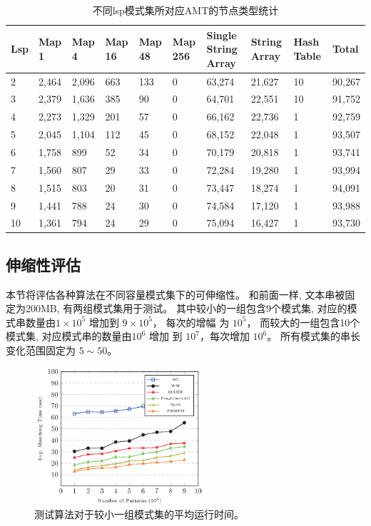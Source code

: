 \begin{table}[!h]
  \centering
  \caption{不同lsp模式集所对应AMT的节点类型统计}
  \scriptsize
  \label{tab:node types}
  \begin{tabular}{p{10pt}p{15pt}p{15pt}p{15pt}p{15pt}p{15pt}p{25pt}p{25pt}p{20pt}p{25pt}}
 \hline
 Lsp &
 Map 1 &
 Map 4 &
 Map 16 &
 Map 48 &
 Map 256 &
 Single String Array &
 String Array   &
 Hash Table &
 Total\\
 \hline
 2  & 2,464 & 2,096 & 663 & 133 & 0 & 63,274 &  21,627 & 10 & 90,267\\
 3  & 2,379 & 1,636 & 385 & 90  & 0 & 64,701 &  22,551 & 10 & 91,752\\
 4  & 2,273 & 1,329 & 201 & 57  & 0 & 66,162 &  22,736 &  1 & 92,759\\
 5  & 2,045 & 1,104 & 112 & 45  & 0 & 68,152 &  22,048 &  1 & 93,507\\
 6  & 1,758 &   899 &  52 & 34  & 0 & 70,179 &  20,818 &  1 & 93,741\\
 7  & 1,560 &   807 &  29 & 33  & 0 & 72,284 &  19,280 &  1 & 93,994\\
 8  & 1,515 &   803 &  20 & 31  & 0 & 73,447 &  18,274 &  1 & 94,091\\
 9  & 1,441 &   788 &  24 & 30  & 0 & 74,584 &  17,120 &  1 & 93,988\\
10  & 1,361 &   794 &  24 & 29  & 0 & 75,094 &  16,427 &  1 & 93,730\\
\hline
  \end{tabular}
\end{table}

\subsection{伸缩性评估}

本节将评估各种算法在不同容量模式集下的可伸缩性。 和前面一样, 文本串被固
定为200MB, 有两组模式集用于测试。 其中较小的一组包含9个模式集, 对应的模
式串数量由$1 \times 10^5$ 增加到 $9 \times 10^5$， 每次的增幅
为 $10^5$， 而较大的一组包含10个模式集, 对应模式串的数量由$10^6$ 增加
到 $10^7$，每次增加 $10^6$。 所有模式集的串长变化范围固定为 $5 \sim
50$。


\begin{figure}[!h]
  \centering
  \includegraphics[height=2in, width=2.5in]{figures/2_MPM/small_group}
  \caption{测试算法对于较小一组模式集的平均运行时间。}
  \label{fig:small_group}
\end{figure}

